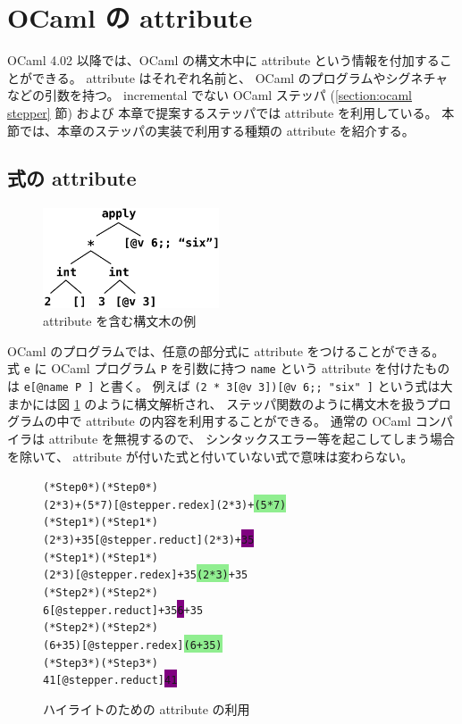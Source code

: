 \section{OCaml の attribute}
\label{OCamlのattribute}
OCaml 4.02 以降では、OCaml の構文木中に attribute
という情報を付加することができる。
attribute はそれぞれ名前と、
OCaml のプログラムやシグネチャなどの引数を持つ。
incremental でない OCaml ステッパ (\ref{section:ocaml stepper} 節) および
本章で提案するステッパでは attribute を利用している。
本節では、本章のステッパの実装で利用する種類の attribute を紹介する。

\subsection{式の attribute}
\label{OCamlのattribute-式のattribute}

\begin{figure}
  \begin{center}
    \includegraphics[width=5.2cm, height=3cm]{5/attribute.png}
  \end{center}
  \caption{attribute を含む構文木の例}
  \label{figure:attribute}
\end{figure}

OCaml のプログラムでは、任意の部分式に attribute をつけることができる。
式 \texttt{e} に OCaml プログラム \texttt{P} を引数に持つ
\texttt{name} という attribute を付けたものは \texttt{e[@name P ]} と書く。
例えば \texttt{(2 * 3[@v 3])[@v 6;; "six" ]} という式は大まかには図
\ref{figure:attribute} のように構文解析され、
ステッパ関数のように構文木を扱うプログラムの中で
attribute の内容を利用することができる。
通常の OCaml コンパイラは attribute を無視するので、
シンタックスエラー等を起こしてしまう場合を除いて、
attribute が付いた式と付いていない式で意味は変わらない。

\begin{figure}
\begin{alltt}
  (* Step 0 *)                              (* Step 0 *)
  (2 * 3) + (5 * 7)[@stepper.redex ]        (2 * 3) + \colorbox{lightgreen}{(5 * 7)}
  (* Step 1 *)                              (* Step 1 *)
  (2 * 3) + 35[@stepper.reduct ]            (2 * 3) + \colorbox{purple}{35}
  (* Step 1 *)                              (* Step 1 *)
  (2 * 3)[@stepper.redex ] + 35             \colorbox{lightgreen}{(2 * 3)} + 35
  (* Step 2 *)                              (* Step 2 *)
  6[@stepper.reduct ] + 35                  \colorbox{purple}{6} + 35
  (* Step 2 *)                              (* Step 2 *)
  (6 + 35)[@stepper.redex ]                 \colorbox{lightgreen}{(6 + 35)}
  (* Step 3 *)                              (* Step 3 *)
  41[@stepper.reduct ]                      \colorbox{purple}{41}
\end{alltt}
\caption{ハイライトのための attribute の利用}
\label{figure:highlight}
\end{figure}

